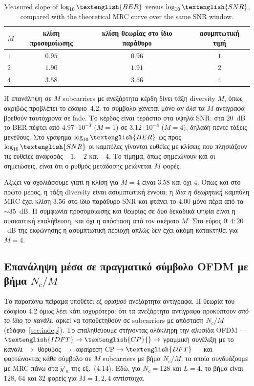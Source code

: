 \documentclass[11pt,a4paper]{article}
\newcommand{\en}[1]{\textenglish{#1}}
\newcommand{\dB}{\en{dB}}
\newcommand{\SNR}{\en{SNR}}
\newcommand{\BER}{\en{BER}}
\newcommand{\MRC}{\en{MRC}}
\newcommand{\CP}{\en{CP}}
\begin{document}
\begin{table}[H]
  \centering\small
  \begin{tabular}{lccc}
    \toprule
    $M$ & κλίση προσομοίωσης & κλίση θεωρίας στο ίδιο παράθυρο & ασυμπτωτική τιμή \\
    \midrule
    $1$ & $0.95$ & $0.96$ & $1$ \\
    $2$ & $1.90$ & $1.91$ & $2$ \\
    $4$ & $3.58$ & $3.56$ & $4$ \\
    \bottomrule
  \end{tabular}
  \caption{\en{Measured slope of $\log_{10}\BER$ versus $\log_{10}\SNR$, compared with the
  theoretical MRC curve over the same SNR window.}}
\end{table}

Η επανάληψη σε $M$ \en{subcarriers} με ανεξάρτητα κέρδη δίνει τάξη \en{diversity} $M$, όπως
ακριβώς προβλέπει το εδάφιο~4.2: το σύμβολο χάνεται μόνο αν \emph{όλα} τα $M$ αντίγραφα
βρεθούν ταυτόχρονα σε \en{fade}. Το κέρδος είναι τεράστιο στα υψηλά \SNR{}: στα $20$~\dB{}
το \BER{} πέφτει από $4.97\cdot10^{-3}$ ($M=1$) σε $3.12\cdot10^{-8}$ ($M=4$), δηλαδή πέντε
τάξεις μεγέθους. Στο γράφημα $\log_{10}\BER$ ως προς $\log_{10}\SNR$ οι καμπύλες γίνονται
ευθείες με κλίσεις που πλησιάζουν τις ευθείες αναφοράς $-1$, $-2$ και $-4$. Το τίμημα, όπως
σημειώνουν και οι σημειώσεις, είναι ότι ο ρυθμός μετάδοσης μειώνεται $M$ φορές.

Αξίζει να σχολιάσουμε γιατί η κλίση για $M=4$ είναι $3.58$ και όχι $4$. Όπως και στο πρώτο
μέρος, η τάξη \en{diversity} είναι ασυμπτωτική έννοια: η \emph{ίδια η θεωρητική} καμπύλη
\MRC{} έχει κλίση $3.56$ στο ίδιο παράθυρο \SNR{} και φτάνει το $4.00$ μόνο πέρα από τα
$\sim 35$~\dB{}. Η συμφωνία προσομοίωσης και θεωρίας σε δύο δεκαδικά ψηφία είναι η ουσιαστική
επαλήθευση, και όχι η απόσταση από τον ακέραιο $M$. Στο εύρος $0{:}4{:}20$~\dB{} της
εκφώνησης η ασυμπτωτική περιοχή απλώς δεν έχει ακόμη κατακτηθεί για $M=4$.

\subsection{Επανάληψη μέσα σε πραγματικό σύμβολο \en{OFDM} με βήμα $N_c/M$}

Το παραπάνω πείραμα υποθέτει \emph{εξ ορισμού} ανεξάρτητα αντίγραφα. Η θεωρία του εδαφίου
4.2 όμως λέει κάτι ισχυρότερο: ότι τα ανεξάρτητα αντίγραφα προκύπτουν \emph{από το ίδιο το
κανάλι}, αρκεί να τοποθετηθούν σε \en{subcarriers} με απόσταση $N_c/M$
(εδάφιο~\ref{sec:indep}). Το επαληθεύουμε στήνοντας ολόκληρη την αλυσίδα \en{OFDM} —
$\en{IDFT} \to \CP{} \to$ γραμμική συνέλιξη με το κανάλι $\to$ θόρυβος $\to$ αφαίρεση
\CP{} $\to \en{DFT}$ — και φορτώνοντας κάθε σύμβολο σε $M$ \en{subcarriers} με βήμα $N_c/M$,
τα οποία συνδυάζουμε με \MRC{} πάνω στα $\tilde y'_n$ της εξ.~(4.14). Εδώ, για $N_c=128$ και
$L=4$, το βήμα είναι $128$, $64$ και $32$ φορείς για $M = 1, 2, 4$ αντίστοιχα.
\end{document}
